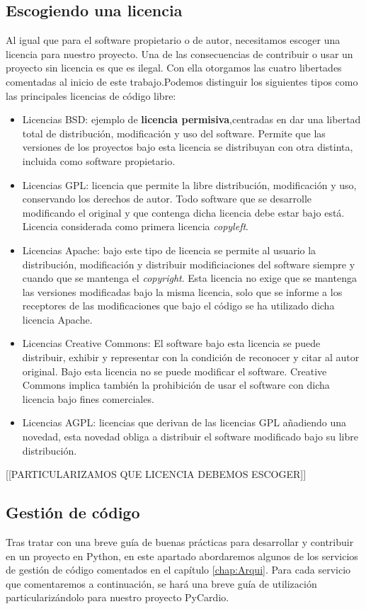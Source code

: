 \subsection*{Escogiendo una licencia}
Al igual que para el software propietario o de autor, necesitamos escoger una licencia para nuestro proyecto. Una de las consecuencias de contribuir o usar un proyecto sin licencia es que es ilegal. Con ella otorgamos las cuatro libertades comentadas al inicio de este trabajo.Podemos distinguir los siguientes tipos como las principales licencias de código libre:
\begin{itemize}
    \item Licencias BSD: ejemplo de \textbf{licencia permisiva},centradas en dar una libertad total de distribución, modificación y uso del software. Permite que las versiones de los proyectos bajo esta licencia se distribuyan con otra distinta, incluida como software propietario.
    \item Licencias GPL: licencia que permite la libre distribución, modificación y uso, conservando los derechos de autor. Todo software que se desarrolle modificando el original y que contenga dicha licencia debe estar bajo está. Licencia considerada como primera licencia \textit{copyleft}.
    \item Licencias Apache: bajo este tipo de licencia se permite al usuario la distribución, modificación y distribuir modificiaciones del software siempre y cuando que se mantenga el \emph{copyright}. Esta licencia no exige que se mantenga las versiones modificadas bajo la misma licencia, solo que se informe a los receptores de las modificaciones que bajo el código se ha utilizado dicha licencia Apache.
    \item Licencias Creative Commons: El software bajo esta licencia se puede distribuir, exhibir y representar con la condición de reconocer y citar al autor original. Bajo esta licencia no se puede modificar el software. Creative Commons implica también la prohibición de usar el software con dicha licencia bajo fines comerciales. 
    \item Licencias AGPL: licencias que derivan de las licencias GPL añadiendo una novedad, esta novedad obliga a distribuir el software modificado bajo su libre distribución.
\end{itemize}

[[PARTICULARIZAMOS QUE LICENCIA DEBEMOS ESCOGER]]

\subsection{Gestión de código}
\label{subsec:}
Tras tratar con una breve guía de buenas prácticas para desarrollar y contribuir en un proyecto en Python, en este apartado abordaremos algunos de los servicios de gestión de código comentados en el capítulo \ref{chap:Arqui}. Para cada servicio que comentaremos a continuación, se hará una breve guía de utilización particularizándolo para nuestro proyecto PyCardio.


